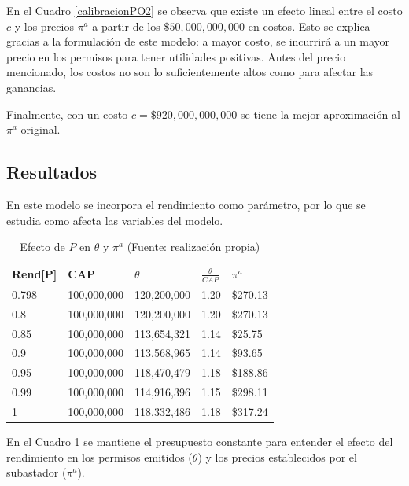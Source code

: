 En el Cuadro \ref{calibracionPO2} se observa que existe un efecto lineal entre el costo $c$ y los precios $\pi^a$ a partir de los $\$50,000,000,000$ en costos. Esto se explica gracias a la formulación de este modelo: a mayor costo, se incurrirá a un mayor precio en los permisos para tener utilidades positivas. Antes del precio mencionado, los costos no son lo suficientemente altos como para afectar las ganancias.
\vspace{2.5mm}

Finalmente, con un costo $c= \$ 920,000,000,000$ se tiene la mejor aproximación al $\pi^a$ original. 
\vspace{2.5mm}

\subsection{Resultados}

En este modelo se incorpora el rendimiento como parámetro, por lo que se estudia como afecta las variables del modelo.
\vspace{2.5mm}

\begin{table}[H]
    \centering
    \begin{tabular}{|l|l|l|l|l|}
    \hline
        Rend[P]  & CAP & $\theta$  & $\frac{\theta}{CAP}$  & $\pi^a$  \\ \hline
        0.798  & 100,000,000  & 120,200,000 & 1.20  &  \$270.13   \\ \hline
        0.8  & 100,000,000 & 120,200,000 & 1.20  &  \$270.13   \\ \hline
        0.85  & 100,000,000 & 113,654,321 & 1.14  &  \$25.75   \\ \hline
        0.9  & 100,000,000 & 113,568,965 & 1.14  &  \$93.65   \\ \hline
        0.95  & 100,000,000 & 118,470,479 & 1.18  &  \$188.86   \\ \hline
        0.99  & 100,000,000 & 114,916,396 & 1.15  &  \$298.11   \\ \hline
        1  & 100,000,000 & 118,332,486 & 1.18  &  \$317.24   \\ \hline
    \end{tabular}
    \caption{{\footnotesize Efecto de $P$ en $\theta$ y $\pi^a$ (Fuente: realización propia)}}
    \label{efectopenthetapia}
\end{table}


En el Cuadro \ref{efectopenthetapia} se mantiene el presupuesto constante para entender el efecto del rendimiento en los permisos emitidos ($\theta$) y los precios establecidos por el subastador ($\pi^a$). 
\vspace{2.5mm}

